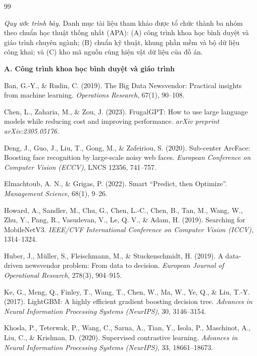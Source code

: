 \begin{thebibliography}{99}

\item[]\hspace*{-\leftmargin}\textit{Quy ước trình bày.} Danh mục tài liệu tham khảo được tổ chức thành ba nhóm theo chuẩn học thuật thống nhất (APA): (A) công trình khoa học bình duyệt và giáo trình chuyên ngành; (B) chuẩn kỹ thuật, khung phần mềm và bộ dữ liệu công khai; và (C) kho mã nguồn cùng hiện vật dữ liệu của đồ án.

\item[]\hspace*{-\leftmargin}\textbf{A. Công trình khoa học bình duyệt và giáo trình}

Ban, G.-Y., \& Rudin, C. (2019).
The Big Data Newsvendor: Practical insights from machine learning.
\textit{Operations Research}, 67(1), 90--108.

Chen, L., Zaharia, M., \& Zou, J. (2023).
FrugalGPT: How to use large language models while reducing cost and improving performance.
\textit{arXiv preprint arXiv:2305.05176}.

Deng, J., Guo, J., Liu, T., Gong, M., \& Zafeiriou, S. (2020).
Sub-center ArcFace: Boosting face recognition by large-scale noisy web faces.
\textit{European Conference on Computer Vision (ECCV)}, LNCS 12356, 741--757.

Elmachtoub, A. N., \& Grigas, P. (2022).
Smart ``Predict, then Optimize''.
\textit{Management Science}, 68(1), 9--26.

Howard, A., Sandler, M., Chu, G., Chen, L.-C., Chen, B., Tan, M., Wang, W., Zhu, Y., Pang, R., Vasudevan, V., Le, Q. V., \& Adam, H. (2019).
Searching for MobileNetV3.
\textit{IEEE/CVF International Conference on Computer Vision (ICCV)}, 1314--1324.

Huber, J., M\"uller, S., Fleischmann, M., \& Stuckenschmidt, H. (2019).
A data-driven newsvendor problem: From data to decision.
\textit{European Journal of Operational Research}, 278(3), 904--915.

Ke, G., Meng, Q., Finley, T., Wang, T., Chen, W., Ma, W., Ye, Q., \& Liu, T.-Y. (2017).
LightGBM: A highly efficient gradient boosting decision tree.
\textit{Advances in Neural Information Processing Systems (NeurIPS)}, 30, 3146--3154.

Khosla, P., Teterwak, P., Wang, C., Sarna, A., Tian, Y., Isola, P., Maschinot, A., Liu, C., \& Krishnan, D. (2020).
Supervised contrastive learning.
\textit{Advances in Neural Information Processing Systems (NeurIPS)}, 33, 18661--18673.


\end{thebibliography}
